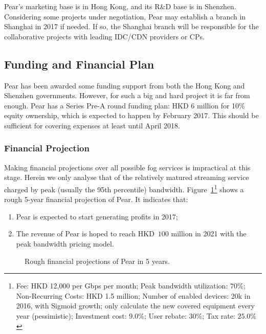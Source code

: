 Pear's marketing base is in Hong Kong, and its R\&D base is in Shenzhen. Considering some projects under negotiation, Pear may establish a branch in Shanghai in 2017 if needed. If so, the Shanghai branch will be responsible for the collaborative projects with leading IDC/CDN providers or CPs. 

\subsection{Funding and Financial Plan}
Pear has been awarded some funding support from both the Hong Kong and Shenzhen governments. However, for such a big and hard project it is far from enough. Pear has a Series Pre-A round funding plan: HKD $6$ million for 10\% equity ownership, which is expected to happen by February 2017. This should be sufficient for covering expenses at least until April 2018. 

\subsubsection{Financial Projection}
Making financial projections over all possible fog services is impractical at this stage. Herein we only analyse that of the relatively matured streaming service charged by peak (usually the 95th percentile) bandwidth. Figure~\ref{fig:financial-projections}\footnote{Fee: HKD 12,000 per Gbps per month; Peak bandwidth utilization: $70\%$;  Non-Recurring Costs: HKD 1.5 million; Number of enabled devices: 20k in 2016, with Sigmoid growth; only calculate the new covered equipment every year (pessimistic); Investment cost: $9.0\%$; User rebate: $30\%$; Tax rate: $25.0\%$} shows a rough 5-year financial projection of Pear. It indicates that: 
\begin{enumerate}
	\item Pear is expected to start generating profits in 2017;
	\item The revenue of Pear is hoped to reach HKD~$100$ million in 2021 with the peak bandwidth pricing model. 
\end{enumerate}

\begin{figure}[ht]
	\centering
	
	\caption{Rough financial projections of Pear in 5 years.} \label{fig:financial-projections}
\end{figure}

